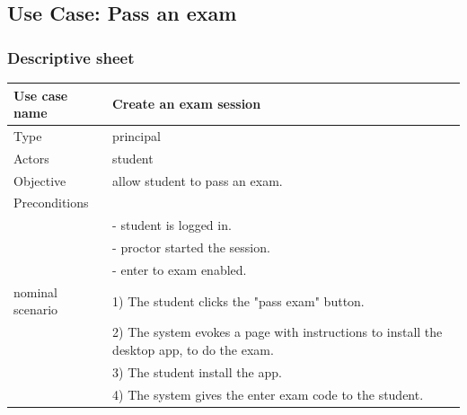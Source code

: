 \documentclass[]{uc2pfecaneva}
\begin{document}
\begin{table}[h]
	\raggedright\subsection{Use Case: Pass an exam}
	\subsubsection{Descriptive sheet}
	\centering
	\begin{tabularx}{\textwidth}{|l|X|}
		\hline
		Use case name         & Create an exam session                                                                            \\ \hline
		Type                  & principal                                                                                         \\ \hline
		Actors                & student                                                                                           \\ \hline
		Objective             & allow student to pass an exam.                                                                    \\ \hline
		Preconditions         &                                                                                                   \\
		                      & - student is logged in.                                                                           \\
		                      & - proctor started the session.                                                                    \\
		                      & - enter to exam enabled.                                                                          \\ \hline
		nominal scenario
		                      & 1) The student clicks the "pass exam" button.                                                     \\
		                      & 2) The system evokes a page with instructions to install the desktop app, to do the exam.         \\
		                      & 3) The student install the app.                                                                   \\
		                      & 4) The system gives the enter exam code to the student.                                           \\

\end{tabularx}
\end{table}
\end{document}
